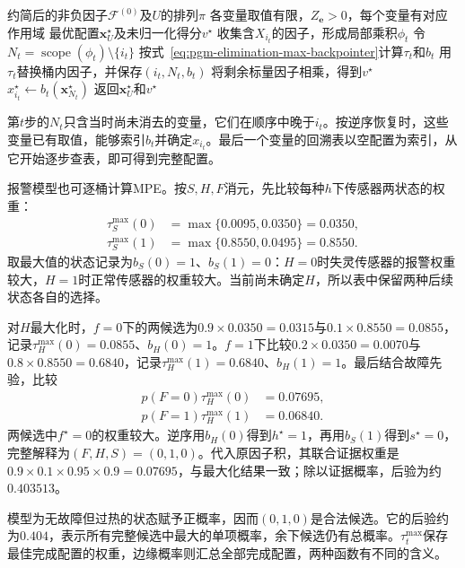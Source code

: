 \begin{algorithm}[MPE消元及配置回溯]
  \label{alg:pgm-elimination-mpe}
  \begin{algorithmic}[1]
    \Require 约简后的非负因子$\mathcal{F}^{(0)}$及$U$的排列$\pi$
    \Require 各变量取值有限，$Z_{\bm{e}}>0$，每个变量有对应作用域
    \Ensure 最优配置$\bm{x}_U^\star$及未归一化得分$v^\star$
      \State 收集含$X_{i_t}$的因子，形成局部乘积$\phi_t$
      \State 令$N_t=\operatorname{scope}(\phi_t)\setminus\{i_t\}$
      \State 按式~\eqref{eq:pgm-elimination-max-backpointer}计算$\tau_t$和$b_t$
      \State 用$\tau_t$替换桶内因子，并保存$(i_t,N_t,b_t)$
    \EndFor
    \State 将剩余标量因子相乘，得到$v^\star$
      \State $x_{i_t}^\star\gets b_t(\bm{x}_{N_t}^\star)$
    \EndFor
    \State 返回$\bm{x}_U^\star$和$v^\star$
  \end{algorithmic}
\end{algorithm}

第$t$步的$N_t$只含当时尚未消去的变量，它们在顺序中晚于$i_t$。按逆序恢复时，这些变量已有取值，能够索引$b_t$并确定$x_{i_t}$。最后一个变量的回溯表以空配置为索引，从它开始逐步查表，即可得到完整配置。

报警模型也可逐桶计算MPE。按$S,H,F$消元，先比较每种$h$下传感器两状态的权重：
\[
  \begin{aligned}
    \tau_S^{\max}(0)&=\max\{0.0095,0.0350\}=0.0350,\\
    \tau_S^{\max}(1)&=\max\{0.8550,0.0495\}=0.8550.
  \end{aligned}
\]
取最大值的状态记录为$b_S(0)=1$、$b_S(1)=0$：$H=0$时失灵传感器的报警权重较大，$H=1$时正常传感器的权重较大。当前尚未确定$H$，所以表中保留两种后续状态各自的选择。

对$H$最大化时，$f=0$下的两候选为$0.9\times0.0350=0.0315$与$0.1\times0.8550=0.0855$，记录$\tau_H^{\max}(0)=0.0855$、$b_H(0)=1$。$f=1$下比较$0.2\times0.0350=0.0070$与$0.8\times0.8550=0.6840$，记录$\tau_H^{\max}(1)=0.6840$、$b_H(1)=1$。最后结合故障先验，比较
\[
  \begin{aligned}
    p(F=0)\tau_H^{\max}(0)&=0.07695,\\
    p(F=1)\tau_H^{\max}(1)&=0.06840.
  \end{aligned}
\]
两候选中$f^\star=0$的权重较大。逆序用$b_H(0)$得到$h^\star=1$，再用$b_S(1)$得到$s^\star=0$，完整解释为$(F,H,S)=(0,1,0)$。代入原因子积，其联合证据权重是$0.9\times0.1\times0.95\times0.9=0.07695$，与最大化结果一致；除以证据概率，后验为约$0.403513$。

模型为无故障但过热的状态赋予正概率，因而$(0,1,0)$是合法候选。它的后验约为$0.404$，表示所有完整候选中最大的单项概率，余下候选仍有总概率。$\tau_t^{\max}$保存最佳完成配置的权重，边缘概率则汇总全部完成配置，两种函数有不同的含义。

